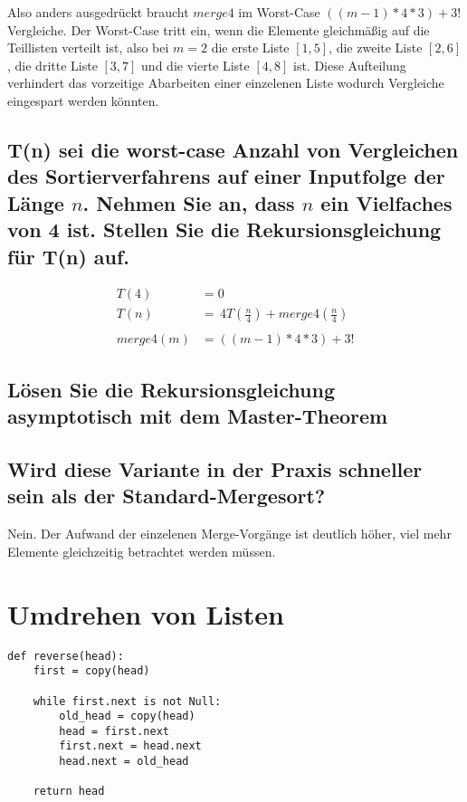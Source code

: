 \documentclass{article}
\begin{document}
Also anders ausgedrückt braucht $merge4$ im Worst-Case $((m - 1) * 4 * 3) + 3!$ Vergleiche.
Der Worst-Case tritt ein, wenn die Elemente gleichmäßig auf die Teillisten verteilt ist, also
bei $m = 2$ die erste Liste $[1, 5]$, die zweite Liste $[2, 6]$, die dritte Liste $[3, 7]$
und die vierte Liste $[4, 8]$ ist. Diese Aufteilung verhindert das vorzeitige Abarbeiten
einer einzelenen Liste wodurch Vergleiche eingespart werden könnten.

\subsection{T(n) sei die worst-case Anzahl von Vergleichen des Sortierverfahrens auf
einer Inputfolge der Länge $n$. Nehmen Sie an, dass $n$ ein Vielfaches von 4 ist.
Stellen Sie die Rekursionsgleichung für T(n) auf.}

\begin{align*}
	         T(4) & = 0                                        \\
	         T(n) & = \, 4T(\frac{n}{4}) + merge4(\frac{n}{4}) \\
	\\
	    merge4(m) & = ((m - 1) * 4 * 3) + 3!
\end{align*}

\subsection{Lösen Sie die Rekursionsgleichung asymptotisch mit dem Master-Theorem}

\subsection{Wird diese Variante in der Praxis schneller sein als der Standard-Mergesort?}

Nein. Der Aufwand der einzelenen Merge-Vorgänge ist deutlich höher, viel mehr Elemente
gleichzeitig betrachtet werden müssen.

\section{Umdrehen von Listen}

\begin{lstlisting}
def reverse(head):
    first = copy(head)

    while first.next is not Null:
        old_head = copy(head)
        head = first.next
        first.next = head.next
        head.next = old_head

    return head
\end{lstlisting}
\end{document}
